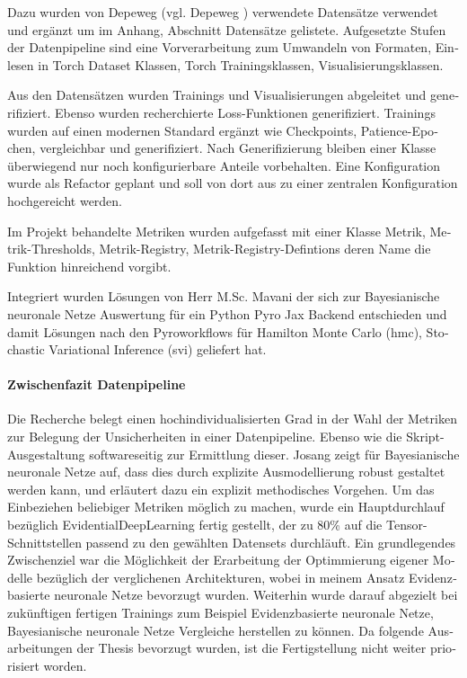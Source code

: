 \begin{otherlanguage}{ngerman}
Dazu wurden von Depeweg (vgl. Depeweg \parencite{Depeweg2019}) verwendete Datensätze verwendet und ergänzt um im Anhang, Abschnitt Datensätze gelistete. Aufgesetzte Stufen der Datenpipeline sind eine Vorverarbeitung zum Umwandeln von Formaten, Einlesen in Torch Dataset Klassen, Torch Trainingsklassen, Visualisierungsklassen.

Aus den Datensätzen wurden Trainings und Visualisierungen abgeleitet und generifiziert. Ebenso wurden recherchierte Loss-Funktionen generifiziert. Trainings wurden auf einen modernen Standard ergänzt wie Checkpoints, Patience-Epochen, vergleichbar und generifiziert. Nach Generifizierung bleiben einer Klasse überwiegend nur noch konfigurierbare Anteile vorbehalten. Eine Konfiguration wurde als Refactor geplant und soll von dort aus zu einer zentralen Konfiguration hochgereicht werden.

Im Projekt behandelte Metriken wurden aufgefasst mit einer Klasse Metrik, Metrik-Thresholds, Metrik-Registry, Metrik-Registry-Defintions deren Name die Funktion hinreichend vorgibt.

Integriert wurden Lösungen von Herr M.Sc. Mavani der sich zur \gls{Bayesianische neuronale Netze} Auswertung für ein Python Pyro Jax Backend entschieden und damit Lösungen nach den Pyroworkflows für Hamilton Monte Carlo (\gls{hmc}), Stochastic Variational Inference (\gls{svi}) geliefert hat.  

\paragraph{Zwischenfazit Datenpipeline} Die Recherche belegt einen hochindividualisierten Grad in der Wahl der Metriken zur Belegung der Unsicherheiten in einer Datenpipeline. Ebenso wie die Skript-Ausgestaltung softwareseitig zur Ermittlung dieser. Josang zeigt für \gls{Bayesianische neuronale Netze} auf, dass dies durch explizite Ausmodellierung robust gestaltet werden kann, und erläutert dazu ein explizit methodisches Vorgehen. Um das Einbeziehen beliebiger Metriken möglich zu machen, wurde ein Hauptdurchlauf bezüglich \gls{EvidentialDeepLearning} fertig gestellt, der zu 80\% auf die Tensor-Schnittstellen passend zu den gewählten Datensets durchläuft. Ein grundlegendes Zwischenziel war die Möglichkeit der Erarbeitung der Optimmierung eigener Modelle bezüglich der verglichenen Architekturen, wobei in meinem Ansatz \gls{Evidenzbasierte neuronale Netze} bevorzugt wurden. Weiterhin wurde darauf abgezielt bei zukünftigen fertigen Trainings zum Beispiel \gls{Evidenzbasierte neuronale Netze}, \gls{Bayesianische neuronale Netze} Vergleiche herstellen zu können. Da folgende Ausarbeitungen der Thesis bevorzugt wurden, ist die Fertigstellung nicht weiter priorisiert worden.  




\end{otherlanguage}
